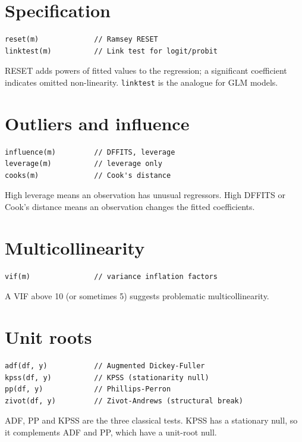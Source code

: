 \section{Specification}

\begin{lstlisting}[caption={RESET and link test}]
reset(m)             // Ramsey RESET
linktest(m)          // Link test for logit/probit
\end{lstlisting}

RESET adds powers of fitted values to the regression; a significant
coefficient indicates omitted non-linearity. \texttt{linktest} is the analogue
for GLM models.

\section{Outliers and influence}

\begin{lstlisting}[caption={Influence diagnostics}]
influence(m)         // DFFITS, leverage
leverage(m)          // leverage only
cooks(m)             // Cook's distance
\end{lstlisting}

High leverage means an observation has unusual regressors. High DFFITS
or Cook's distance means an observation changes the fitted coefficients.

\section{Multicollinearity}

\begin{lstlisting}[caption={VIF}]
vif(m)               // variance inflation factors
\end{lstlisting}

A VIF above 10 (or sometimes 5) suggests problematic multicollinearity.

\section{Unit roots}

\begin{lstlisting}[caption={Unit-root tests}]
adf(df, y)           // Augmented Dickey-Fuller
kpss(df, y)          // KPSS (stationarity null)
pp(df, y)            // Phillips-Perron
zivot(df, y)         // Zivot-Andrews (structural break)
\end{lstlisting}

ADF, PP and KPSS are the three classical tests. KPSS has a stationary
null, so it complements ADF and PP, which have a unit-root null.

